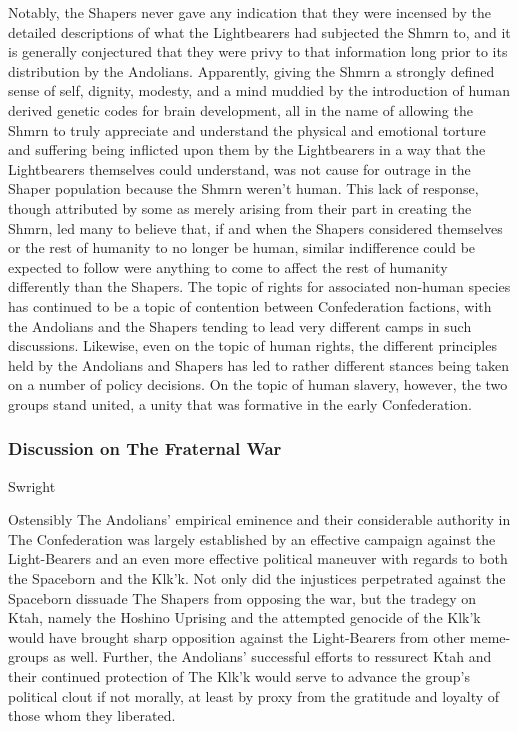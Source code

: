 Notably, the Shapers never gave any indication that they were incensed
by the detailed descriptions of what the Lightbearers had subjected
the Shmrn to, and it is generally conjectured that they were privy to
that information long prior to its distribution by the
Andolians. Apparently, giving the Shmrn a strongly defined sense of
self, dignity, modesty, and a mind muddied by the introduction of
human derived genetic codes for brain development, all in the name of
allowing the Shmrn to truly appreciate and understand the physical and
emotional torture and suffering being inflicted upon them by the
Lightbearers in a way that the Lightbearers themselves could
understand, was not cause for outrage in the Shaper population because
the Shmrn weren't human. This lack of response, though attributed by
some as merely arising from their part in creating the Shmrn, led many
to believe that, if and when the Shapers considered themselves or the
rest of humanity to no longer be human, similar indifference could be
expected to follow were anything to come to affect the rest of
humanity differently than the Shapers. The topic of rights for
associated non-human species has continued to be a topic of contention
between Confederation factions, with the Andolians and the Shapers
tending to lead very different camps in such discussions. Likewise,
even on the topic of human rights, the different principles held by
the Andolians and Shapers has led to rather different stances being
taken on a number of policy decisions. On the topic of human slavery,
however, the two groups stand united, a unity that was formative in
the early Confederation.


\subsubsection{Discussion on The Fraternal War}
Swright

Ostensibly The Andolians' empirical eminence and their considerable
authority in The Confederation was largely established by an effective
campaign against the Light-Bearers and an even more effective
political maneuver with regards to both the Spaceborn and the
Klk'k. Not only did the injustices perpetrated against the Spaceborn
dissuade The Shapers from opposing the war, but the tradegy on Ktah,
namely the Hoshino Uprising and the attempted genocide of the Klk'k
would have brought sharp opposition against the Light-Bearers from
other meme-groups as well. Further, the Andolians' successful efforts
to ressurect Ktah and their continued protection of The Klk'k would
serve to advance the group's political clout if not morally, at least
by proxy from the gratitude and loyalty of those whom they liberated.

